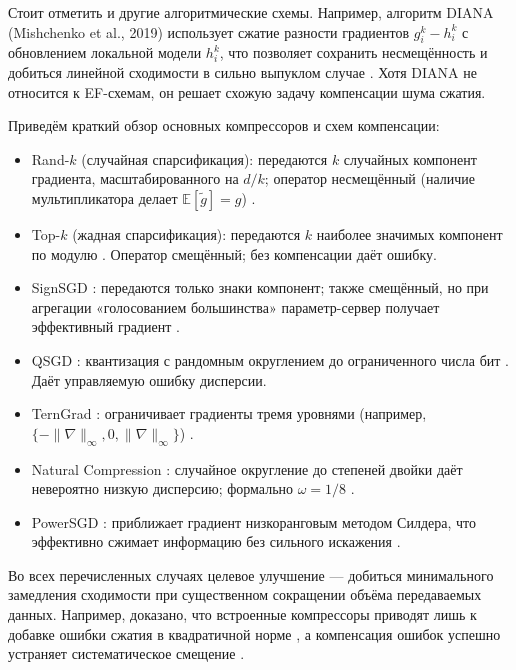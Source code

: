     Стоит отметить и другие алгоритмические схемы. Например, алгоритм DIANA (Mishchenko et al., 2019) использует сжатие разности градиентов \(g_i^k - h_i^k\) с обновлением локальной модели \(h_i^k\), что позволяет сохранить несмещённость и добиться линейной сходимости в сильно выпуклом случае \cite{Mishchenko2019}. Хотя DIANA не относится к EF-схемам, он решает схожую задачу компенсации шума сжатия. 

    Приведём краткий обзор основных компрессоров и схем компенсации:
    \begin{itemize}
        \item Rand-\(k\) (случайная спарсификация): передаются \(k\) случайных компонент градиента, масштабированного на \(d/k\); оператор несмещённый (наличие мультипликатора делает \(\mathbb{E}[\widetilde{g}]=g\)) \cite{Beznosikov2023}.
        \item Top-\(k\) (жадная спарсификация): передаются \(k\) наиболее значимых компонент по модулю \cite{Beznosikov2023}. Оператор смещённый; без компенсации даёт ошибку.
        \item SignSGD \cite{Bernstein2018}: передаются только знаки компонент; также смещённый, но при агрегации «голосованием большинства» параметр-сервер получает эффективный градиент \cite{Bernstein2018}.
        \item QSGD \cite{Alistarh2017}: квантизация с рандомным округлением до ограниченного числа бит \cite{Alistarh2017}. Даёт управляемую ошибку дисперсии.
        \item TernGrad \cite{Wen2017}: ограничивает градиенты тремя уровнями (например, \(\{-\|\nabla\|_\infty,0,\|\nabla\|_\infty\}\)) \cite{Wen2017}.
        \item Natural Compression \cite{Horvath2022}: случайное округление до степеней двойки даёт невероятно низкую дисперсию; формально \(\omega=1/8\) \cite{Horvath2022}.
        \item PowerSGD \cite{Vogels2019}: приближает градиент низкоранговым методом Силдера, что эффективно сжимает информацию без сильного искажения \cite{Vogels2019}.
    \end{itemize}

    Во всех перечисленных случаях целевое улучшение — добиться минимального замедления сходимости при существенном сокращении объёма передаваемых данных. Например, доказано, что встроенные компрессоры приводят лишь к добавке ошибки сжатия в квадратичной норме \cite{Beznosikov2023,Horvath2022}, а компенсация ошибок успешно устраняет систематическое смещение \cite{Stich2020,Vogels2019}.

